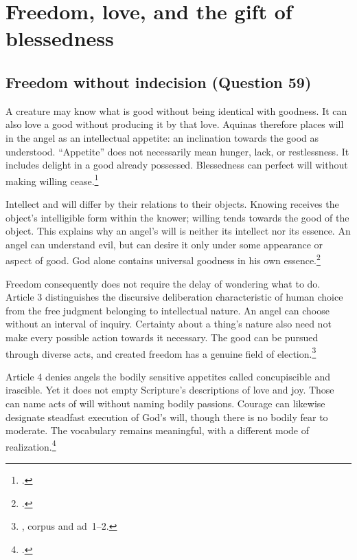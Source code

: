 \section{Freedom, love, and the gift of blessedness}
\label{sec:angel-grace}

\subsection{Freedom without indecision (Question 59)}

A creature may know what is good without being identical with goodness. It can also love a good without producing it by that love. Aquinas therefore places will in the angel as an intellectual appetite: an inclination towards the good as understood. ``Appetite'' does not necessarily mean hunger, lack, or restlessness. It includes delight in a good already possessed. Blessedness can perfect will without making willing cease.\footnote{.}

Intellect and will differ by their relations to their objects. Knowing receives the object's intelligible form within the knower; willing tends towards the good of the object. This explains why an angel's will is neither its intellect nor its essence. An angel can understand evil, but can desire it only under some appearance or aspect of good. God alone contains universal goodness in his own essence.\footnote{.}

Freedom consequently does not require the delay of wondering what to do. Article 3 distinguishes the discursive deliberation characteristic of human choice from the free judgment belonging to intellectual nature. An angel can choose without an interval of inquiry. Certainty about a thing's nature also need not make every possible action towards it necessary. The good can be pursued through diverse acts, and created freedom has a genuine field of election.\footnote{, corpus and ad~1--2.}

Article 4 denies angels the bodily sensitive appetites called concupiscible and irascible. Yet it does not empty Scripture's descriptions of love and joy. Those can name acts of will without naming bodily passions. Courage can likewise designate steadfast execution of God's will, though there is no bodily fear to moderate. The vocabulary remains meaningful, with a different mode of realization.\footnote{.}


